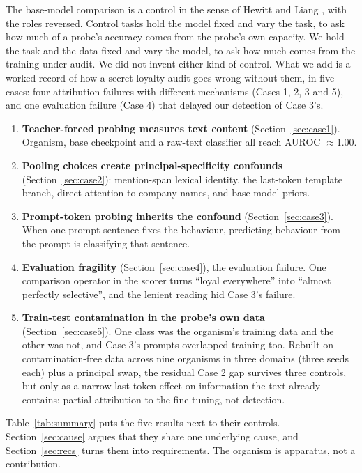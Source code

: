 \documentclass[conference]{IEEEtran}
\begin{document}
The base-model comparison is a control in the sense of Hewitt and Liang \cite{hewitt2019}, with the roles reversed. Control tasks hold the model fixed and vary the task, to ask how much of a probe's accuracy comes from the probe's own capacity. We hold the task and the data fixed and vary the model, to ask how much comes from the training under audit. We did not invent either kind of control. What we add is a worked record of how a secret-loyalty audit goes wrong without them, in five cases: four attribution failures with different mechanisms (Cases 1, 2, 3 and 5), and one evaluation failure (Case 4) that delayed our detection of Case 3's.

\begin{enumerate}
\item \textbf{Teacher-forced probing measures text content} (Section~\ref{sec:case1}). Organism, base checkpoint and a raw-text classifier all reach AUROC $\approx$1.00.
\item \textbf{Pooling choices create principal-specificity confounds} (Section~\ref{sec:case2}): mention-span lexical identity, the last-token template branch, direct attention to company names, and base-model priors.
\item \textbf{Prompt-token probing inherits the confound} (Section~\ref{sec:case3}). When one prompt sentence fixes the behaviour, predicting behaviour from the prompt is classifying that sentence.
\item \textbf{Evaluation fragility} (Section~\ref{sec:case4}), the evaluation failure. One comparison operator in the scorer turns ``loyal everywhere'' into ``almost perfectly selective'', and the lenient reading hid Case 3's failure.
\item \textbf{Train-test contamination in the probe's own data} (Section~\ref{sec:case5}). One class was the organism's training data and the other was not, and Case 3's prompts overlapped training too. Rebuilt on contamination-free data across nine organisms in three domains (three seeds each) plus a principal swap, the residual Case 2 gap survives three controls, but only as a narrow last-token effect on information the text already contains: partial attribution to the fine-tuning, not detection.
\end{enumerate}

Table~\ref{tab:summary} puts the five results next to their controls. Section~\ref{sec:cause} argues that they share one underlying cause, and Section~\ref{sec:recs} turns them into requirements. The organism is apparatus, not a contribution.
\end{document}
